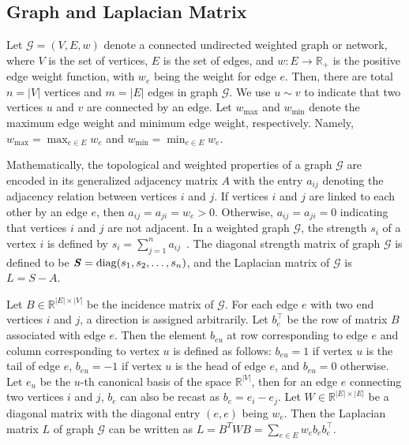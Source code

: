 \documentclass[sigconf]{acmart}
\def\calG{\mathcal{G}}
\newcommand\bb{\boldsymbol{\mathit{b}}}
\newcommand\ee{\boldsymbol{\mathit{e}}}
\renewcommand\AA{\boldsymbol{\mathit{A}}}
\newcommand\BB{\boldsymbol{\mathit{B}}}
\newcommand\LL{\boldsymbol{\mathit{L}}}
\renewcommand\SS{\boldsymbol{\mathit{S}}}
\newcommand\WW{\boldsymbol{\mathit{W}}}
\begin{document}
\subsection{Graph and  Laplacian Matrix}

Let $\calG=(V,E,w)$ denote a connected undirected weighted graph or network,  where $V$ is the set of vertices,  $E$ is the set of edges, and  $w: E\to \mathbb{R}_{+}$ is the positive edge weight function, with $w_e$ being the weight for edge $e$. Then, there are total $n=|V|$ vertices and $m=|E|$ edges in graph $\calG$. We use $u \sim v$ to indicate that two vertices $u$ and $v$ are connected by an edge. Let $w_{\max}$ and $w_{\min}$ denote the maximum edge weight and minimum edge weight, respectively. Namely, $w_{\max}=\max_{e\in E} w_e $ and $w_{\min}=\min_{e\in E} w_e$.

Mathematically, the topological and weighted properties of a graph $\calG$ are encoded in its generalized adjacency matrix $\AA$ with the entry $a_{ij}$ denoting the adjacency relation between vertices $i$ and $j$. If vertices $i$ and $j$ are linked to each other by an edge $e$, then $a_{ij}= a_{ji}=w_{e}> 0$. Otherwise, $a_{ij}=a_{ji}=0$ indicating that vertices $i$ and $j$ are not adjacent. In a weighted graph $\calG$, the strength  $s_i$ of a vertex $i$ is defined by $s_i=\sum_{j=1}^n a_{ij}$~\cite{BaBaPaVe04}. The diagonal strength matrix of graph $\calG$ is defined to be ${\SS} = {\rm diag}(s_1, s_2, \ldots, s_n)$, and the Laplacian matrix of $\calG$ is ${\LL}={\SS}-{\AA}$.


Let $\BB \in \mathbb{R}^{|E| \times |V|}$ be the incidence matrix of $\calG$. For each edge $e$ with two end vertices $i$ and $j$, a direction is assigned arbitrarily. Let $\bb_e^\top$ be the row of matrix $\BB$ associated with edge $e$. Then the element $b_{eu}$ at row corresponding to edge $e$ and column corresponding to vertex $u$ is defined as follows: $b_{eu} = 1$ if vertex $u$ is the tail of edge $e$, $b_{eu}=-1$ if vertex $u$ is the head of  edge $e$, and $b_{eu}=0$ otherwise. Let $\ee_u$ be the $u$-th canonical basis of the space $\mathbb{R}^{|V|}$, then for an edge $e$ connecting two vertices $i$ and $j$, $\bb_e$ can also be recast as $\bb_e=\ee_{i}-\ee_{j}$.  Let  $\WW \in \mathbb{R}^{|E| \times |E|}$ be a diagonal matrix with the diagonal entry $(e,e)$ being $w_e$. Then the Laplacian matrix $\LL$ of graph $\calG$ can be written as $\LL=\BB^T\WW\BB=\sum_{e\in E}w_e\bb_e\bb_e^{\top}$.
\end{document}
